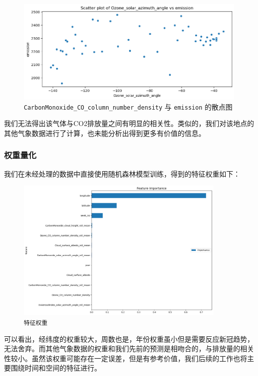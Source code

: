 \documentclass{ctexart}
\begin{document}
\begin{figure}[H]
      \centering
      \includegraphics[width=1\textwidth]{output7.png}
      \caption{\label{fig:7}\texttt{CarbonMonoxide\_CO\_column\_number\_density} 与 \texttt{emission} 的散点图}
\end{figure}

我们无法得出该气体与CO2排放量之间有明显的相关性。类似的，我们对该地点的其他气象数据进行了计算，也未能分析出得到更多有价值的信息。

\subsubsection{权重量化}

我们在未经处理的数据中直接使用随机森林模型训练，得到的特征权重如下：

\begin{figure}[H]
      \centering
      \includegraphics[width=0.9\textwidth]{output11.png}
      \caption{\label{fig:11}\texttt{特征权重}}
\end{figure}

可以看出，经纬度的权重较大，周数也是，年份权重虽小但是需要反应新冠趋势，无法舍弃。而其他气象数据的权重和我们先前的预测是相吻合的，与排放量的相关性较小。虽然该权重可能存在一定误差，但是有参考价值，我们后续的工作也将主要围绕时间和空间的特征进行。
\end{document}
